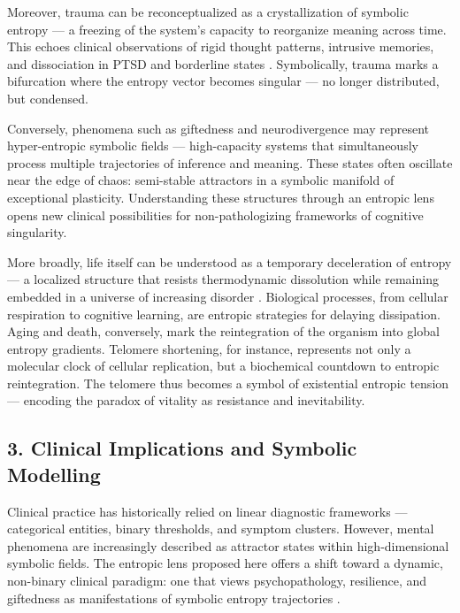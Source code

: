 Moreover, trauma can be reconceptualized as a crystallization of symbolic entropy — a freezing of the system’s capacity to reorganize meaning across time. This echoes clinical observations of rigid thought patterns, intrusive memories, and dissociation in PTSD and borderline states \cite{van2014body}. Symbolically, trauma marks a bifurcation where the entropy vector becomes singular — no longer distributed, but condensed.

Conversely, phenomena such as giftedness and neurodivergence may represent hyper-entropic symbolic fields — high-capacity systems that simultaneously process multiple trajectories of inference and meaning. These states often oscillate near the edge of chaos: semi-stable attractors in a symbolic manifold of exceptional plasticity. Understanding these structures through an entropic lens opens new clinical possibilities for non-pathologizing frameworks of cognitive singularity.

More broadly, life itself can be understood as a temporary deceleration of entropy — a localized structure that resists thermodynamic dissolution while remaining embedded in a universe of increasing disorder \cite{blackburn2015telomeres}. Biological processes, from cellular respiration to cognitive learning, are entropic strategies for delaying dissipation. Aging and death, conversely, mark the reintegration of the organism into global entropy gradients. Telomere shortening, for instance, represents not only a molecular clock of cellular replication, but a biochemical countdown to entropic reintegration. The telomere thus becomes a symbol of existential entropic tension — encoding the paradox of vitality as resistance and inevitability.

\subsection*{3. Clinical Implications and Symbolic Modelling}

Clinical practice has historically relied on linear diagnostic frameworks — categorical entities, binary thresholds, and symptom clusters. However, mental phenomena are increasingly described as attractor states within high-dimensional symbolic fields. The entropic lens proposed here offers a shift toward a dynamic, non-binary clinical paradigm: one that views psychopathology, resilience, and giftedness as manifestations of symbolic entropy trajectories \cite{bzdok2016network, sporns2013structure, tagliazucchi2016}.

